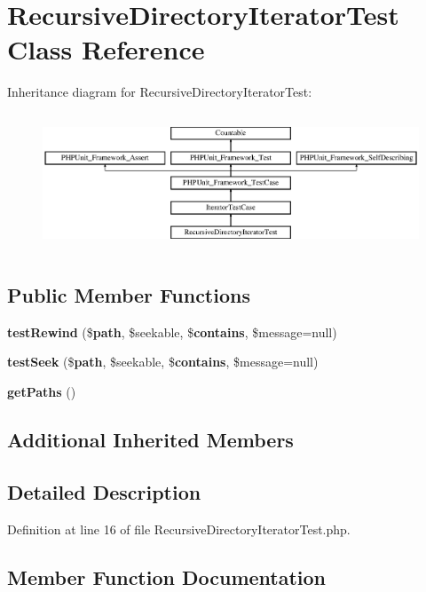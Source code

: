 \section{Recursive\+Directory\+Iterator\+Test Class Reference}
\label{class_symfony_1_1_component_1_1_finder_1_1_tests_1_1_iterator_1_1_recursive_directory_iterator_test}
Inheritance diagram for Recursive\+Directory\+Iterator\+Test\+:\begin{figure}[H]
\begin{center}
\leavevmode
\includegraphics[height=4.129793cm]{class_symfony_1_1_component_1_1_finder_1_1_tests_1_1_iterator_1_1_recursive_directory_iterator_test}
\end{center}
\end{figure}
\subsection*{Public Member Functions}
\begin{DoxyCompactItemize}
\item 
{\bf test\+Rewind} (\${\bf path}, \$seekable, \${\bf contains}, \$message=null)
\item 
{\bf test\+Seek} (\${\bf path}, \$seekable, \${\bf contains}, \$message=null)
\item 
{\bf get\+Paths} ()
\end{DoxyCompactItemize}
\subsection*{Additional Inherited Members}


\subsection{Detailed Description}


Definition at line 16 of file Recursive\+Directory\+Iterator\+Test.\+php.



\subsection{Member Function Documentation}
